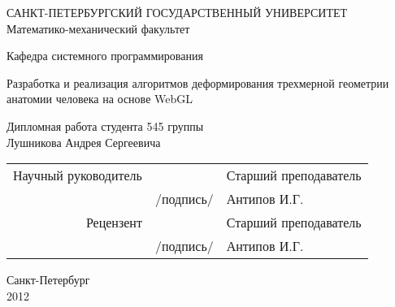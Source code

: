 \thispagestyle{empty}
\begin{center}
САНКТ-ПЕТЕРБУРГСКИЙ ГОСУДАРСТВЕННЫЙ УНИВЕРСИТЕТ\\
Математико-механический факультет\\
\end{center}
\begin{center}
Кафедра системного программирования\\
\end{center}
\vspace{2cm}
\begin{center}
    \Large{Разработка и реализация алгоритмов деформирования трехмерной геометрии
 анатомии человека на основе WebGL} \\
\end{center}
\vspace{1cm}
\begin{center}
    \normalsize{Дипломная работа студента 545 группы} \\
    \large{Лушникова Андрея Сергеевича}
\end{center}
\vspace{3cm}
\begin{center}
    \begin{tabular}{rcl}
        Научный руководитель & \dotuline{\phantom{кошерная подпись}} & Старший преподаватель\\
        & /подпись/ & Антипов И.Г.\\
        Рецензент & \dotuline{\phantom{кошерная подпись}} & Старший преподаватель\\
        & /подпись/& Антипов И.Г.
    \end{tabular}
\end{center}
\vspace{\fill}
\begin{center}
    Санкт-Петербург\\2012
\end{center}
\pagebreak
